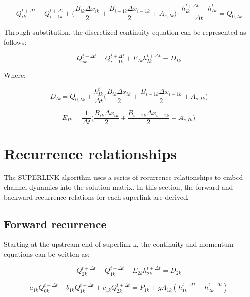 \documentclass[11pt]{article}
\begin{document}
\begin{equation}
 Q_{ik}^{t + \Delta t} - Q_{i - 1k}^{t + \Delta t} + \biggl( \frac{B_{ik} \Delta x_{ik}}{2} + \frac{B_{i - 1k} \Delta x_{i - 1k}}{2} + A_{s,Ik} \biggr) \cdot \frac{h_{Ik}^{t + \Delta t} - h_{Ik}^t}{\Delta t} = Q_{0,Ik}
\end{equation}

Through substitution, the discretized continuity equation can be represented as follows: 

\begin{equation}
  \boxed{
 Q_{ik}^{t + \Delta t} - Q_{i - 1k}^{t + \Delta t} + E_{Ik} h_{Ik}^{t + \Delta t} = D_{Ik}
 }
\end{equation}

Where:

\begin{equation}
  \boxed{
 D_{Ik} = Q_{0,Ik} + \frac{h_{Ik}^t}{\Delta t} \biggl( \frac{B_{ik} \Delta x_{ik}}{2} + \frac{B_{i - 1k} \Delta x_{i - 1k}}{2} + A_{s,Ik}  \biggr) 
 }
\end{equation}

\begin{equation}
  \boxed{
 E_{Ik} = \frac{1}{\Delta t} \biggl( \frac{B_{ik} \Delta x_{ik}}{2} + \frac{B_{i - 1k} \Delta x_{i - 1k}}{2} + A_{s,Ik}  \biggr) 
 }
\end{equation}

\section{Recurrence relationships}

The SUPERLINK algorithm uses a series of recurrence relationships to embed
channel dynamics into the solution matrix. In this section, the forward and
backward recurrence relations for each superlink are derived.

\subsection{Forward recurrence}

Starting at the upstream end of superlink k, the continuity and momentum
equations can be written as:

\begin{equation}
  Q_{2k}^{t + \Delta t} - Q_{1k}^{t + \Delta t} + E_{2k} h_{2k}^{t + \Delta t} = D_{2k}
\end{equation}


\begin{equation}
   a_{1k} Q_{0k}^{t + \Delta t} + b_{1k} Q_{1k}^{t + \Delta t} + c_{1k} Q_{2k}^{t + \Delta t} = P_{1k} + g A_{1k} (h_{1k}^{t + \Delta t} - h_{2k}^{t + \Delta t})
\end{equation}
\end{document}
